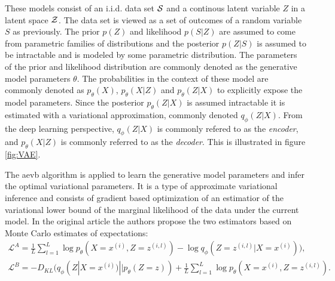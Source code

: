 These models consist of an i.i.d. data set $\mathcal{S}$ and a continous latent variable $Z$ in a latent space $\mathcal{Z}$. The data set is viewed as a set of outcomes of a random variable $S$ as previously. The prior $p(Z)$ and likelihood $p(S|Z)$ are assumed to come from parametric families of distributions and the posterior $p(Z|S)$ is assumed to be intractable and is modeled by some parametric distribution. The parameters of the prior and likelihood distribution are commonly denoted as the generative model parameters $\theta$. The probabilities in the context of these model are commonly denoted as $p_\theta(X)$, $p_\theta(X|Z)$ and $p_\theta(Z|X)$ to explicitly expose the model parameters. Since the posterior $p_\theta(Z|X)$ is assumed intractable it is estimated with a variational approximation, commonly denoted $q_\phi(Z|X)$. From the deep learning perspective, $q_\phi(Z|X)$ is commonly refered to as the \textit{encoder}, and $p_\theta(X|Z)$ is commonly referred to as the \textit{decoder}. This is illustrated in figure \ref{fig:VAE}.

The \acrshort{aevb} algorithm is applied to learn the generative model parameters and infer the optimal variational parameters. It is a type of approximate variational inference and consists of gradient based optimization of an estimatior of the variational lower bound of the marginal likelihood of the data under the current model. In the original article the authors propose the two estimators based on Monte Carlo estimates of expectations:
\begin{equation}
    \label{eq:VAEstimators}
    \begin{aligned}
        \mathcal{L}^A = \frac{1}{L}\sum_{l=1}^L \log p_\theta (X=x^{(i)},Z=z^{(i, l)}) - \log q_\phi (Z=z^{(i, l)} | X=x^{(i)}) ), \\
        \mathcal{L}^B = - D_{KL}(q_\phi (Z | X=x^{(i)}) || p_\theta(Z=z)) + \frac{1}{L}\sum_{l=1}^L \log p_\theta (X=x^{(i)},Z=z^{(i, l)}).
    \end{aligned}
\end{equation}

